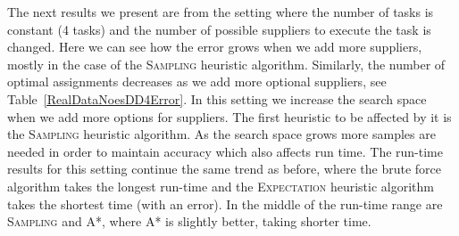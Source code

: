 \documentclass[letterpaper]{article}
\newcommand{\astar}{\textsc{A*}\xspace}
\newcommand{\sampling}{\textsc{Sampling}\xspace}
\newcommand{\expectation}{\textsc{Expectation}\xspace}
\begin{document}
The next results we present are from the setting where the number of tasks is constant (4 tasks) and the number of possible suppliers to execute the task is changed. Here we can see how the error grows when we add more suppliers, mostly in the case of the \sampling heuristic algorithm. Similarly, the number of optimal assignments decreases as we add more optional suppliers, see Table~\ref{RealDataNoesDD4Error}. In this setting we increase the search space when we add more options for suppliers. The first heuristic to be affected by it is the \sampling heuristic algorithm. As the search space grows more samples are needed in order to maintain accuracy which also affects run time.
The run-time results %
for this setting continue the same trend as before, where the brute force algorithm takes the longest run-time and the \expectation heuristic algorithm takes the shortest time (with an error). In the middle of the run-time range are \sampling and \astar, where \astar is slightly better, taking shorter time.
\end{document}
